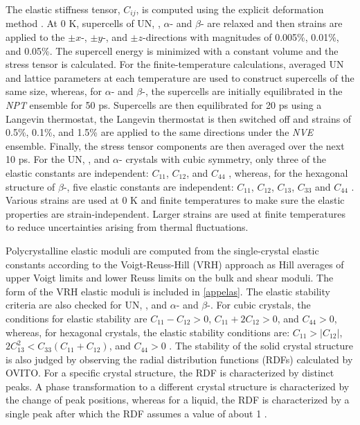 \documentclass[preprint, 12pt]{elsarticle}
\providecommand{\DIFaddtex}[1]{{\protect\color{blue} \sf #1}} %
\providecommand{\DIFaddbegin}{} %
\providecommand{\DIFaddend}{} %
\providecommand{\DIFadd}[1]{\texorpdfstring{\DIFaddtex{#1}}{#1}} %
\newcommand{\DIFaddincludegraphics}[2][]{{\color{blue}\fbox{\DIFOincludegraphics[#1]{#2}}}} %
\DeclareRobustCommand{\DIFaddbegin}{\DIFOaddbegin \let\includegraphics\DIFaddincludegraphics} %
\DeclareRobustCommand{\DIFaddend}{\DIFOaddend \let\includegraphics\DIFOincludegraphics} %
\begin{document}
The elastic stiffness tensor, $C_{ij}$, is computed using the explicit deformation method \cite{Clavier2017}. At 0 K, supercells of UN, , $\alpha$-  and $\beta$- are relaxed and then strains are applied to the $\pm x$-, $\pm y$-, and $ \pm z$-directions with magnitudes of 0.005\%, 0.01\%, and 0.05\%. The supercell energy is minimized with a constant volume and the stress tensor is calculated. For the finite-temperature calculations, averaged UN and  lattice parameters at each temperature are used to construct supercells of the same size, whereas, for $\alpha$- and $\beta$-, the supercells are initially equilibrated in the \textit{NPT} ensemble for 50 ps. Supercells are then equilibrated for 20 ps using a Langevin thermostat, the Langevin thermostat is then switched off and strains of 0.5\%, 0.1\%, and 1.5\% are applied to the same directions under the \textit{NVE} ensemble. Finally, the stress tensor components are then averaged over the next 10 ps. For the UN, , and $\alpha$- crystals with cubic symmetry, only three of the elastic constants are independent: $C_{11}$, $C_{12}$, and $C_{44}$ \cite{Meyers2008}, whereas, for the hexagonal structure of $\beta$-, five elastic constants are independent: $C_{11}$, $C_{12}$, $C_{13}$, $C_{33}$ and $C_{44}$ \cite{Boer2018}. Various strains are used at 0 K and finite temperatures to make sure the elastic properties are strain-independent. Larger strains are used at finite temperatures to reduce uncertainties arising from thermal fluctuations.

Polycrystalline elastic moduli are computed from the single-crystal elastic constants according to the Voigt-Reuss-Hill (VRH) approach \cite{Anderson1963, Meyers2008, Clavier2017} as Hill averages of upper Voigt limits and lower Reuss limits on the bulk and shear moduli. The form of the VRH elastic moduli is included in \ref{appelas}. The elastic stability criteria are also checked for UN, , and $\alpha$- and $\beta$-. For cubic crystals, the conditions for elastic stability are $C_{11} - C_{12} > 0$, $C_{11} + 2 C_{12} > 0$, and $C_{44} > 0$, whereas, for hexagonal crystals, the elastic stability conditions are: $C_{11} > |C_{12}|$, $2C_{13}^2 < C_{33}(C_{11}+C_{12})$, and $C_{44} > 0$ \cite{Mouhat2014}. \DIFaddbegin \DIFadd{The stability of the solid crystal structure is also judged by observing the radial distribution functions (RDFs) calculated by OVITO. For a specific crystal structure, the RDF is characterized by distinct peaks. A phase transformation to a different crystal structure is characterized by the change of peak positions, whereas for a liquid, the RDF is characterized by a single peak after which the RDF assumes a value of about 1 \cite{Rapaport2004}.
}\DIFaddend 
\end{document}
